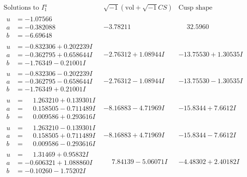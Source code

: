 \documentclass[1p]{elsarticle_modified}
\theoremstyle{definition}
\newcommand{\I}{\sqrt{-1}}
\begin{document}
$$\begin{array}{c|c|c}  
\text{Solutions to }I^u_{1}& \I (\text{vol} + \sqrt{-1}CS) & \text{Cusp shape}\\
 \hline 
\begin{aligned}
u &= -1.07566\phantom{ +0.000000I} \\
a &= -0.382088\phantom{ +0.000000I} \\
b &= -6.69648\phantom{ +0.000000I}\end{aligned}
 & -3.78211\phantom{ +0.000000I} & \phantom{-}32.5960\phantom{ +0.000000I} \\ \hline\begin{aligned}
u &= -0.832306 + 0.202239 I \\
a &= -0.362795 + 0.658644 I \\
b &= -1.76349 - 0.21001 I\end{aligned}
 & -2.76312 + 1.08944 I & -13.75530 + 1.30535 I \\ \hline\begin{aligned}
u &= -0.832306 - 0.202239 I \\
a &= -0.362795 - 0.658644 I \\
b &= -1.76349 + 0.21001 I\end{aligned}
 & -2.76312 - 1.08944 I & -13.75530 - 1.30535 I \\ \hline\begin{aligned}
u &= \phantom{-}1.263210 + 0.139301 I \\
a &= \phantom{-}0.158505 - 0.711489 I \\
b &= \phantom{-}0.009586 + 0.293616 I\end{aligned}
 & -8.16883 - 4.71969 I & -15.8344 + 7.6612 I \\ \hline\begin{aligned}
u &= \phantom{-}1.263210 - 0.139301 I \\
a &= \phantom{-}0.158505 + 0.711489 I \\
b &= \phantom{-}0.009586 - 0.293616 I\end{aligned}
 & -8.16883 + 4.71969 I & -15.8344 - 7.6612 I \\ \hline\begin{aligned}
u &= \phantom{-}1.31469 + 0.95832 I \\
a &= -0.606321 + 1.088860 I \\
b &= -0.10260 - 1.75202 I\end{aligned}
 & \phantom{-}7.84139 - 5.06071 I & -4.48302 + 2.40182 I \\ \hline\begin{aligned}

\end{aligned}
\end{array}$$
\end{document}

